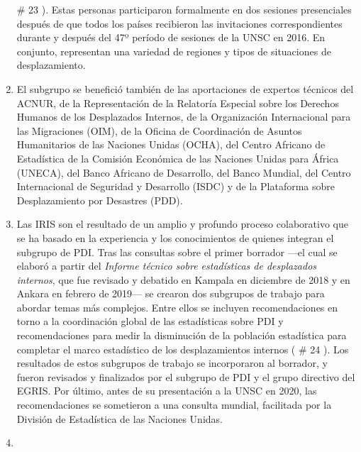 \documentclass[
]{book}
\begin{document}
\begin{enumerate}
  \# 23
  ). Estas personas participaron formalmente en dos sesiones presenciales después de que todos los países recibieron las invitaciones correspondientes durante y después del 47º período de sesiones de la UNSC en 2016. En conjunto, representan una variedad de regiones y tipos de situaciones de desplazamiento.
\item
  El subgrupo se benefició también de las aportaciones de expertos técnicos del ACNUR, de la Representación de la Relatoría Especial sobre los Derechos Humanos de los Desplazados Internos, de la Organización Internacional para las Migraciones (OIM), de la Oficina de Coordinación de Asuntos Humanitarios de las Naciones Unidas (OCHA), del Centro Africano de Estadística de la Comisión Económica de las Naciones Unidas para África (UNECA), del Banco Africano de Desarrollo, del Banco Mundial, del Centro Internacional de Seguridad y Desarrollo (ISDC) y de la Plataforma sobre Desplazamiento por Desastres (PDD).
\item
  Las IRIS son el resultado de un amplio y profundo proceso colaborativo que se ha basado en la experiencia y los conocimientos de quienes integran el subgrupo de PDI. Tras las consultas sobre el primer borrador ---el cual se elaboró a partir del \emph{Informe técnico sobre estadísticas de desplazados internos}, que fue revisado y debatido en Kampala en diciembre de 2018 y en Ankara en febrero de 2019--- se crearon dos subgrupos de trabajo para abordar temas más complejos. Entre ellos se incluyen recomendaciones en torno a la coordinación global de las estadísticas sobre PDI y recomendaciones para medir la disminución de la población estadística para completar el marco estadístico de los desplazamientos internos (
  \# 24
  ). Los resultados de estos subgrupos de trabajo se incorporaron al borrador, y fueron revisados y finalizados por el subgrupo de PDI y el grupo directivo del EGRIS. Por último, antes de su presentación a la UNSC en 2020, las recomendaciones se sometieron a una consulta mundial, facilitada por la División de Estadística de las Naciones Unidas.
\item ~
  \hypertarget{justificaciuxf3n-y-alcance}{%
}
\end{enumerate}
\end{document}
